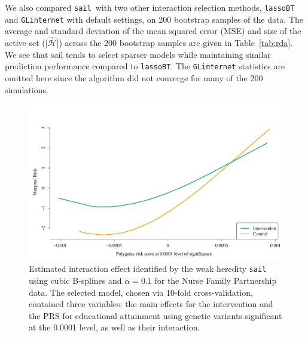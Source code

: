 \documentclass[12pt,letter]{article}\usepackage[]{graphicx}\usepackage[]{color}
\newenvironment{knitrout}{}{} %
\newcommand{\sail}{\texttt{sail}}
\begin{document}
We also compared \sail ~with two other interaction selection methods, \texttt{lassoBT} and \texttt{GLinternet} with default settings, on 200 bootstrap samples of the data. The average and standard deviation of the mean squared error (MSE) and size of the active set ($|\widehat{\mathcal{H}}$|) across the 200 bootstrap samples are given in Table~\ref{tab:rda}. We see that sail tends to select sparser models while maintaining similar prediction performance compared to \texttt{lassoBT}. The \texttt{GLinternet} statistics are omitted here since the algorithm did not converge for many of the 200 simulations.










\begin{knitrout}\scriptsize
{}\color{fgcolor}\begin{figure}[H]

{\centering \includegraphics[width=1\linewidth]{figure/PRS-intervention-interaction-1} 

}

\caption[Estimated interaction effect identified by the weak heredity \texttt{sail} using cubic B-splines and $\alpha=0.1$ for the Nurse Family Partnership data]{Estimated interaction effect identified by the weak heredity \texttt{sail} using cubic B-splines and $\alpha=0.1$ for the Nurse Family Partnership data. The selected model, chosen via 10-fold cross-validation, contained three variables: the main effects for the intervention and the PRS for educational attainment using genetic variants significant at the 0.0001 level, as well as their interaction.}\label{fig:PRS-intervention-interaction}
\end{figure}


\end{knitrout}
\end{document}
